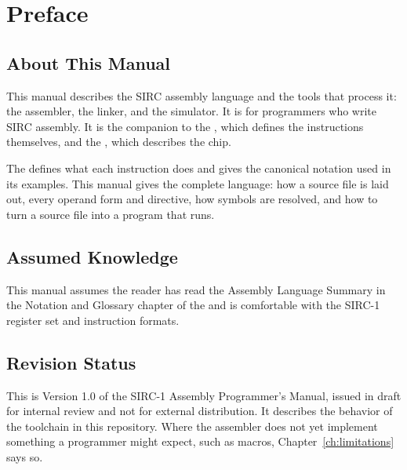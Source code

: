 \chapter*{Preface}
\label{ch:preface}

\section*{About This Manual}

This manual describes the SIRC assembly language and the tools that process it: the assembler, the linker, and the
simulator. It is for programmers who write SIRC assembly. It is the companion to the \archmanual{}, which defines the
instructions themselves, and the \hwmanual{}, which describes the chip.

The \archmanual{} defines what each instruction does and gives the canonical notation used in its examples. This manual
gives the complete language: how a source file is laid out, every operand form and directive, how symbols are resolved,
and how to turn a source file into a program that runs.

\section*{Assumed Knowledge}

This manual assumes the reader has read the Assembly Language Summary in the Notation and Glossary chapter of the
\archmanual{} and is comfortable with the SIRC-1 register set and instruction formats.

\section*{Revision Status}

This is Version 1.0 of the SIRC-1 Assembly Programmer's Manual, issued in draft for internal review and not for
external distribution. It describes the behavior of the toolchain in this repository. Where the assembler does not yet
implement something a programmer might expect, such as macros, Chapter~\ref{ch:limitations} says so.
